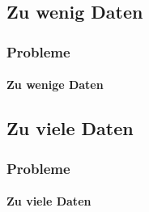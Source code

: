 \subsection{Zu wenig Daten}
\begin{frame}
\frametitle{Probleme}
\framesubtitle{Zu wenige Daten}
\end{frame}


\subsection{Zu viele Daten}
\begin{frame}
\frametitle{Probleme}
\framesubtitle{Zu viele Daten}
\end{frame}